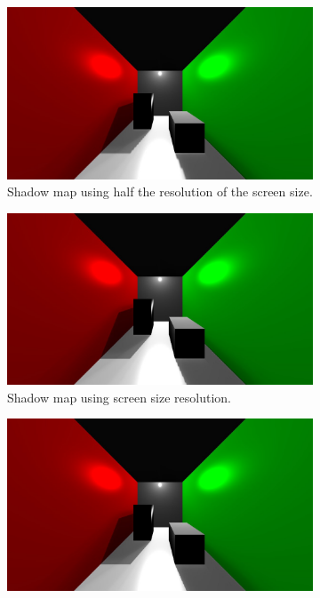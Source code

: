 \begin{figure}
        \centering
        \begin{subfigure}[b]{0.5\textwidth}
                \includegraphics[width=\textwidth]{AltResults/05SM.jpg}
                \caption{Shadow map using half the resolution of the screen size.}
        \end{subfigure}
        \centering
        \begin{subfigure}[b]{0.5\textwidth}
                \includegraphics[width=\textwidth]{AltResults/1SM.jpg}
                \caption{Shadow map using screen size resolution.}
        \end{subfigure}
        \centering
        \begin{subfigure}[b]{0.5\textwidth}
        		\includegraphics[width=\textwidth]{AltResults/2SM.jpg}

\end{subfigure}
\end{figure}
